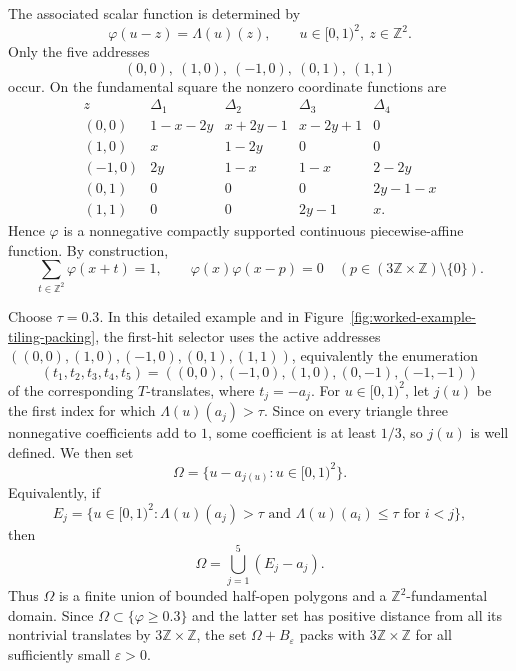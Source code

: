 \documentclass[11pt,reqno]{amsart}
\numberwithin{equation}{section}
\theoremstyle{definition}
\theoremstyle{remark}
\newcommand{\Z}{\mathbb Z}
\newcommand{\eps}{\varepsilon}
\begin{document}
The associated scalar function is determined by
\[
 \varphi(u-z)=\Lambda(u)(z),
 \qquad u\in[0,1)^2,\ z\in\Z^2.
\]
Only the five addresses
\[
 (0,0),\ (1,0),\ (-1,0),\ (0,1),\ (1,1)
\]
occur.  On the fundamental square the nonzero coordinate functions are
\begin{equation}\label{eq:worked-example-phi-table}
\begin{array}{c|cccc}
 z&\Delta_1&\Delta_2&\Delta_3&\Delta_4\\ \hline
 (0,0)
 &1-x-2y&x+2y-1&x-2y+1&0\\
 (1,0)
 &x&1-2y&0&0\\
 (-1,0)
 &2y&1-x&1-x&2-2y\\
 (0,1)
 &0&0&0&2y-1-x\\
 (1,1)
 &0&0&2y-1&x.
\end{array}
\end{equation}
Hence $\varphi$ is a nonnegative compactly supported continuous piecewise-affine function.
By construction,
\[
 \sum_{t\in\Z^2}\varphi(x+t)=1,
 \qquad
 \varphi(x)\varphi(x-p)=0\quad (p\in(3\Z\times\Z)\setminus\{0\}).
\]

Choose $\tau=0.3$.  In this detailed example and in Figure~\ref{fig:worked-example-tiling-packing}, the first-hit selector uses the active addresses
$((0,0),(1,0),(-1,0),(0,1),(1,1))$, equivalently the enumeration
\begin{equation}\label{eq:standard-first-hit-enumeration}
 (t_1,t_2,t_3,t_4,t_5)=((0,0),(-1,0),(1,0),(0,-1),(-1,-1))
\end{equation}
of the corresponding $T$-translates, where $t_j=-a_j$.
For $u\in[0,1)^2$, let $j(u)$ be the first index for which
$\Lambda(u)(a_j)>\tau$.  Since on every triangle three nonnegative coefficients add to $1$,
some coefficient is at least $1/3$, so $j(u)$ is well defined.  We then set
\begin{equation}\label{eq:worked-example-Omega}
 \Omega=\{u-a_{j(u)}:u\in[0,1)^2\}.
\end{equation}
Equivalently, if
\[
 E_j=\{u\in[0,1)^2:\Lambda(u)(a_j)>\tau\text{ and }\Lambda(u)(a_i)\le \tau\text{ for }i<j\},
\]
then
\[
 \Omega=\bigcup_{j=1}^5(E_j-a_j).
\]
Thus $\Omega$ is a finite union of bounded half-open polygons and a $\Z^2$-fundamental domain.  Since
$\Omega\subset\{\varphi\ge 0.3\}$ and the latter set has positive distance from all its
nontrivial translates by $3\Z\times\Z$, the set $\Omega+B_\eps$ packs with
$3\Z\times\Z$ for all sufficiently small $\eps>0$.
\end{document}
